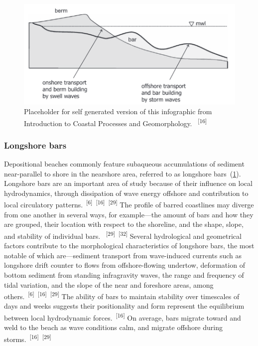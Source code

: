 \documentclass{article}
\begin{document}

\begin{figure}
    \centering
    \includegraphics[width=.9\linewidth]{images/barred-profile.png}
    \caption{Placeholder for self generated version of this infographic from Introduction to Coastal Processes and Geomorphology. ~\textsuperscript{[16]}}
    \label{figure9}
\end{figure}

\subsubsection{Longshore bars}


\par{Depositional beaches commonly feature subaqueous accumulations of sediment near-parallel to shore in the nearshore area, referred to as longshore bars~(\cref{figure9}). Longshore bars are an important area of study because of their influence on local hydrodynamics, through dissipation of wave energy offshore and contribution to local circulatory patterns.~\textsuperscript{[6]}~\textsuperscript{[16]}~\textsuperscript{[29]} The profile of barred coastlines may diverge from one another in several ways, for example---the amount of bars and how they are grouped, their location with respect to the shoreline, and the shape, slope, and stability of individual bars. ~\textsuperscript{[29]}~\textsuperscript{[32]} Several hydrological and geometrical factors contribute to the morphological characteristics of longshore bars, the most notable of which are---sediment transport from wave-induced currents such as longshore drift counter to flows from offshore-flowing undertow, deformation of bottom sediment from standing infragravity waves, the range and frequency of tidal variation, and the slope of the near and foreshore areas, among others.~\textsuperscript{[6]}~\textsuperscript{[16]}~\textsuperscript{[29]} The ability of bars to maintain stability over timescales of days and weeks suggests their positionality and form represent the equilibrium between local hydrodynamic forces.~\textsuperscript{[16]} On average, bars migrate toward and weld to the beach as wave conditions calm, and migrate offshore during storms.~\textsuperscript{[16]}~\textsuperscript{[29]}}
\end{document}
